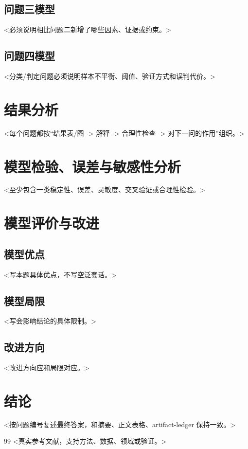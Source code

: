 \documentclass{ctexart}
\begin{document}
\subsection{问题三模型}
<必须说明相比问题二新增了哪些因素、证据或约束。>

\subsection{问题四模型}
<分类/判定问题必须说明样本不平衡、阈值、验证方式和误判代价。>

\section{结果分析}

<每个问题都按“结果表/图 -> 解释 -> 合理性检查 -> 对下一问的作用”组织。>

\section{模型检验、误差与敏感性分析}

<至少包含一类稳定性、误差、灵敏度、交叉验证或合理性检验。>

\section{模型评价与改进}

\subsection{模型优点}
<写本题具体优点，不写空泛套话。>

\subsection{模型局限}
<写会影响结论的具体限制。>

\subsection{改进方向}
<改进方向应和局限对应。>

\section{结论}

<按问题编号复述最终答案，和摘要、正文表格、artifact-ledger 保持一致。>

\begin{thebibliography}{99}
<真实参考文献，支持方法、数据、领域或验证。>
\end{thebibliography}
\end{document}
